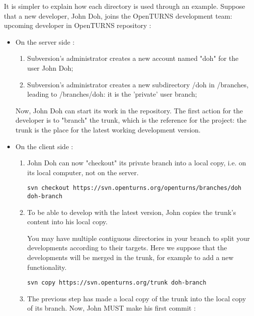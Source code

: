 \documentclass[11pt]{article}
\begin{document}
It is simpler to explain how each directory is used through an example. Suppose that a new developer, John Doh, joins the OpenTURNS development team:
upcoming developer in OpenTURNS repository :
\begin{itemize}
\item On the server side :

  \begin{enumerate}
  \item Subversion's administrator creates a new account named "doh" for the user John Doh;
  \item Subversion's administrator creates a new subdirectory /doh in /branches, leading to /branches/doh: it is the 'private' user branch;
  \end{enumerate}

  Now, John Doh can start its work in the repository. The first action for the developer is to "branch" the trunk, which is the reference for the project: the trunk is the place for the latest working development version.

\item On the client side :

  \begin{enumerate}

  \item John Doh can now "checkout" its private branch into a local copy, i.e. on its local computer, not on the server.

\begin{verbatim}
svn checkout https://svn.openturns.org/openturns/branches/doh doh-branch
\end{verbatim}

  \item To be able to develop with the latest version, John copies the trunk's content into his local copy.

    You may have multiple contiguous directories in your branch to split your developments according to their targets.
    Here we suppose that the developments will be merged in the trunk, for example to add a new functionality.

\begin{verbatim}
svn copy https://svn.openturns.org/trunk doh-branch
\end{verbatim}

  \item The previous step has made a local copy of the trunk into the local copy of its branch. Now, John MUST make his first commit :


\end{enumerate}
\end{itemize}
\end{document}
